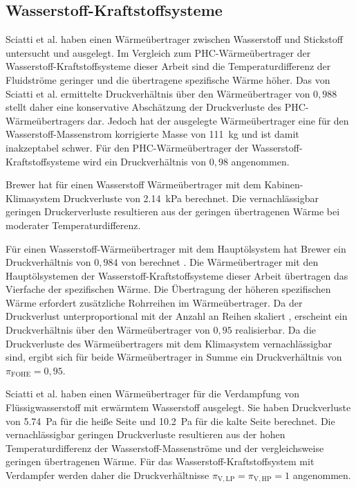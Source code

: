 \subsection{Wasserstoff-Kraftstoffsysteme}

Sciatti et al. \cite{Sciatti.2025} haben einen Wärmeübertrager zwischen Wasserstoff und Stickstoff untersucht und ausgelegt. Im Vergleich zum PHC-Wärmeübertrager der Wasserstoff-Kraftstoffsysteme dieser Arbeit sind die Temperaturdifferenz der Fluidströme geringer und die übertragene spezifische Wärme höher. Das von Sciatti et al. ermittelte Druckverhältnis über den Wärmeübertrager von $0,988$ stellt daher eine konservative Abschätzung der Druckverluste des PHC-Wärmeübertragers dar. Jedoch hat der ausgelegte Wärmeübertrager eine für den Wasserstoff-Massenstrom korrigierte Masse von \SI{111}{\kg} und ist damit inakzeptabel schwer. Für den PHC-Wärmeübertrager der Wasserstoff-Kraftstoffsysteme wird ein Druckverhältnis von $0,98$ angenommen.

Brewer \cite{Brewer.1991} hat für einen Wasserstoff Wärmeübertrager mit dem Kabinen-Klimasystem Druckverluste von \SI{2.14}{\kilo\Pa} berechnet. Die vernachlässigbar geringen Druckerverluste resultieren aus der geringen übertragenen Wärme bei moderater Temperaturdifferenz.

Für einen Wasserstoff-Wärmeübertrager mit dem Hauptölsystem hat Brewer ein Druckverhältnis von $0,984$ von berechnet \cite{Brewer.1991}. Die Wärmeübertrager mit den Hauptölsystemen der Wasserstoff-Kraftstoffsysteme dieser Arbeit übertragen das Vierfache der spezifischen Wärme. Die Übertragung der höheren spezifischen Wärme erfordert zusätzliche Rohrreihen im Wärmeübertrager. Da der Druckverlust unterproportional mit der Anzahl an Reihen skaliert \cite{.2013b}, erscheint ein Druckverhältnis über den Wärmeübertrager von $0,95$ realisierbar. Da die Druckverluste des Wärmeübertragers mit dem Klimasystem vernachlässigbar sind, ergibt sich für beide Wärmeübertrager in Summe ein Druckverhältnis von $\pi_{\mathrm{FOHE}}=0,95$.

Sciatti et al. \cite{Sciatti.2025} haben einen Wärmeübertrager für die Verdampfung von Flüssigwasserstoff mit erwärmtem Wasserstoff ausgelegt. Sie haben Druckverluste von \SI{5.74}{\Pa} für die heiße Seite und \SI{10.2}{\Pa} für die kalte Seite berechnet. Die vernachlässigbar geringen Druckverluste resultieren aus der hohen Temperaturdifferenz der Wasserstoff-Massenströme und der vergleichsweise geringen übertragenen Wärme. Für das Wasserstoff-Kraftstoffsystem mit Verdampfer werden daher die Druckverhältnisse $\pi_{\mathrm{V,LP}}=\pi_{\mathrm{V,HP}}=1$ angenommen.

